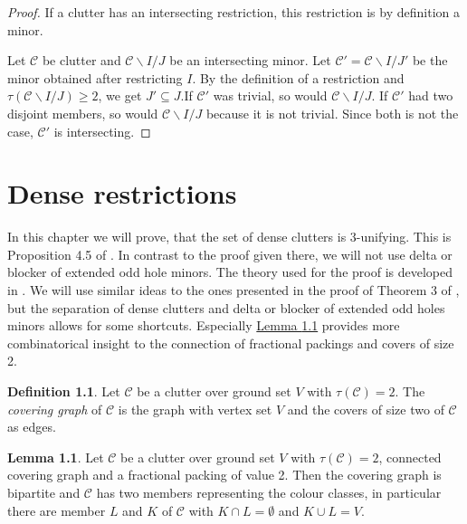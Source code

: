 \documentclass[a4paper, 12pt, twoside=false]{scrbook}
\theoremstyle{definition}
\newtheorem*{definition}{Definition}
\newtheorem{lemma}[theorem]{Lemma}
\begin{document}
  \begin{proof}
      If a clutter has an intersecting restriction, this restriction is by definition a minor.

      Let $\mathcal{C}$ be clutter and $\mathcal{C} \backslash I /J$ be an intersecting minor.
      Let $\mathcal{C'}=\mathcal{C} \backslash I /J'$ be the minor obtained after restricting $I$.
      By the definition of a restriction and $\tau(\mathcal{C} \backslash I /J) \geq 2$, we get $J' \subseteq J$.If $\mathcal{C'}$ was trivial, so would $\mathcal{C} \backslash I / J$.
      If $\mathcal{C'}$ had two disjoint members, so would $\mathcal{C} \backslash I /J$ because it is not trivial.
      Since both is not the case, $\mathcal{C'}$ is intersecting.
  \end{proof}


   \chapter{Dense restrictions}
   In this chapter we will prove, that the set of dense clutters is 3-unifying.
   This is Proposition 4.5 of \cite{restrictions}.
   In contrast to the proof given there, we will not use delta or blocker of extended odd hole minors.
   The theory used for the proof is developed in \cite{deltas}.
   We will use similar ideas to the ones presented in the proof of Theorem 3 of \cite{deltas}, but the separation of dense clutters and delta or blocker of extended odd holes minors allows for some shortcuts.
   Especially \hyperref[bipartite]{Lemma \ref*{bipartite}} provides more combinatorical insight to the connection of fractional packings and covers of size 2.
   \begin{definition}
       Let $\mathcal{C}$ be a clutter over ground set $V$ with $\tau(\mathcal{C})=2$.
       The \emph{covering graph} of $\mathcal{C}$ is the graph with vertex set $V$ and the covers of size two of $\mathcal{C}$ as edges.
   \end{definition}

   \begin{lemma}\label{bipartite}
       Let $\mathcal{C}$ be a clutter over ground set $V$ with $\tau(\mathcal{C})=2$, connected covering graph and a fractional packing of value 2.
       Then the covering graph is bipartite and $\mathcal{C}$ has two members representing the colour classes, in particular there are member $L$ and $K$ of $\mathcal{C}$ with $K \cap L = \emptyset$ and $K \cup L = V$.
   \end{lemma}
\end{document}
